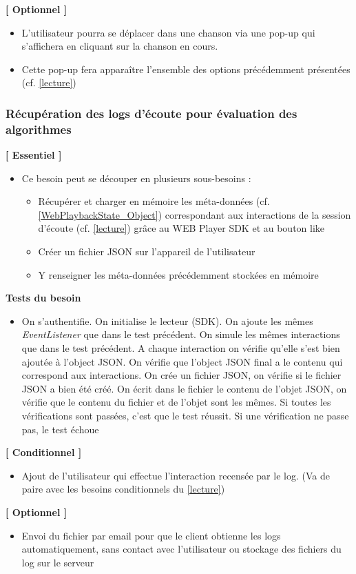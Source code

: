 \documentclass{article}
\begin{document}
		\textbf{[ Optionnel ]}
		\begin{itemize}
			\item L'utilisateur pourra se déplacer dans une chanson via une pop-up qui s'affichera en cliquant sur la chanson en cours. 
			\item Cette pop-up fera apparaître l'ensemble des options précédemment présentées (cf. \ref{lecture})
		\end{itemize}
		\newpage
		\subsubsection{Récupération des logs d'écoute pour évaluation des algorithmes} \label{logs}
		\textbf{[ Essentiel ]}
		\begin{itemize}
			\item Ce besoin peut se découper en plusieurs sous-besoins :
			      \begin{itemize}
			      	\item Récupérer et charger en mémoire les méta-données (cf. \ref{WebPlaybackState_Object}) correspondant aux interactions de la session d'écoute (cf. \ref{lecture}) grâce au WEB Player SDK et au bouton like
			      	\item Créer un fichier JSON sur l'appareil de l'utilisateur
			      	\item Y renseigner les méta-données précédemment stockées en mémoire
			      \end{itemize}
		\end{itemize}
		\textbf{Tests du besoin}
		\begin{itemize}
			\item On s'authentifie. On initialise le lecteur (SDK). On ajoute les mêmes  \textit{EventListener} que dans le test précédent. On simule les mêmes interactions que dans le test précédent. A chaque interaction on vérifie qu'elle s'est bien ajoutée à l'object JSON. On vérifie que l'object JSON final a le contenu qui correspond aux interactions. On crée un fichier JSON, on vérifie si le fichier JSON a bien été créé. On écrit dans le fichier le contenu de l'objet JSON, on vérifie que le contenu du fichier et de l'objet sont les mêmes. Si toutes les vérifications sont passées, c’est que le test réussit. Si une vérification ne passe pas, le test échoue
		\end{itemize}
		\textbf{[ Conditionnel ]}
		\begin{itemize}
			\item Ajout de l'utilisateur qui effectue l'interaction recensée par le log. (Va de paire avec les besoins conditionnels du \ref{lecture})
		\end{itemize}
		\textbf{[ Optionnel ]}
		\begin{itemize}
			\item Envoi du fichier par email pour que le client obtienne les logs automatiquement, sans contact avec l'utilisateur ou stockage des fichiers du log sur le serveur
		\end{itemize}
\end{document}
